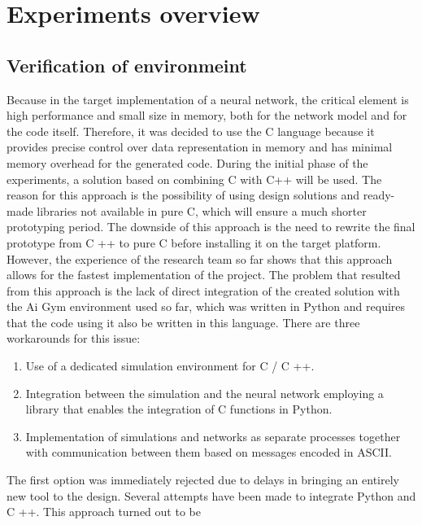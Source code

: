 \FloatBarrier
\chapter{Experiments overview}

\FloatBarrier
\section{Verification of environmeint}
Because in the target implementation of a neural network, the critical element is high 
performance and small size in memory, both for the network model and for the code itself. 
Therefore, it was decided to use the C language because it provides precise control over data 
representation in memory and has minimal memory overhead for the generated code. 
During the initial phase of the experiments, a solution based on combining C with C++ 
will be used. The reason for this approach is the possibility of using design solutions and 
ready-made libraries not available in pure C, which will ensure a much shorter prototyping period.
The downside of this approach is the need to rewrite the final prototype from C ++ to pure C 
before installing it on the target platform. 
However, the experience of the research team so far shows that this approach allows for the 
fastest implementation of the project. 
The problem that resulted from this approach is the lack of direct integration of the created 
solution with the Ai Gym environment used so far, which was written in Python and requires that 
the code using it also be written in this language. 
There are three workarounds for this issue: 
\begin{enumerate}
	\item Use of a dedicated simulation environment for C / C ++.
	\item Integration between the simulation and the neural network employing a library that 
		enables the integration of C functions in Python. 
	\item Implementation of simulations and networks as separate processes together with 
		communication between them based on messages encoded in ASCII.
\end{enumerate}
The first option was immediately rejected due to delays in bringing an entirely new tool 
to the design. 
Several attempts have been made to integrate Python and C ++. This approach turned out to be 
